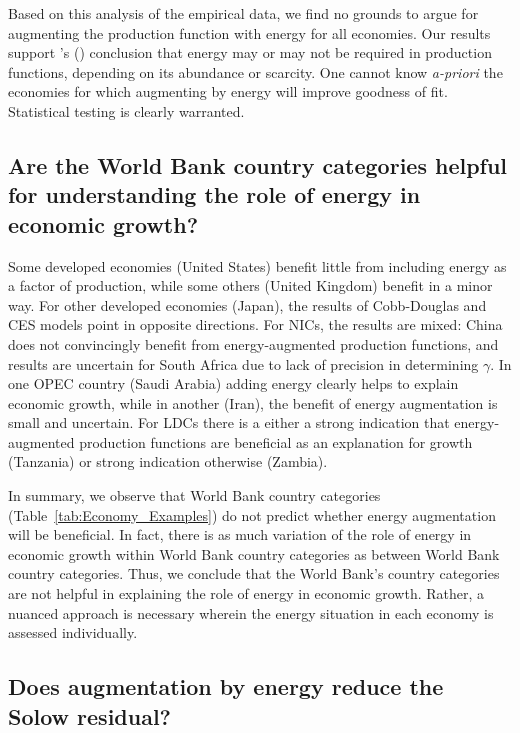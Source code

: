 \documentclass[preprint,authoryear,12pt]{elsarticle}\usepackage[]{graphicx}\usepackage[]{color}
\newcommand{\citeapos}[1]{\citeauthor{#1}'s (\citeyear{#1})} %
\begin{document}
Based on this analysis of the empirical data, 
we find no grounds to argue for augmenting the production function 
with energy for all economies. 
Our results support \citeapos{Stern:2011bq} conclusion that energy 
may or may not be required in production functions,
depending on its abundance or scarcity. 
One cannot know \emph{a-priori} the economies 
for which augmenting by energy will improve goodness of fit. 
Statistical testing is clearly warranted. 


\subsection{Are the World Bank country categories
helpful for understanding the role of energy in economic growth?} 
\label{sec:wb_categories_helpful}

Some developed economies (United States) benefit little from including energy as a factor of production, 
while some others (United Kingdom) benefit in a minor way. 
For other developed economies (Japan), 
the results of Cobb-Douglas and CES models point in opposite directions.  
For NICs, the results are mixed:
China does not convincingly benefit from energy-augmented production functions, 
and results are uncertain for South Africa due to lack of precision in determining $\gamma$.  
In one OPEC country (Saudi Arabia) adding energy clearly helps to explain economic growth, 
while in another (Iran), the benefit of energy augmentation is small and uncertain. 
For LDCs there is a either a strong indication that energy-augmented production functions 
are beneficial as an explanation for growth (Tanzania) or strong indication otherwise (Zambia).  

In summary, we observe that World Bank country categories (Table~\ref{tab:Economy_Examples}) 
do not predict whether energy augmentation will be beneficial. 
In fact, 
there is as much variation of the role of energy in economic growth 
within World Bank country categories
as between World Bank country categories. 
Thus, we conclude that the World Bank’s country categories are not helpful 
in explaining the role of energy in economic growth. 
Rather, a nuanced approach is necessary wherein the energy situation 
in each economy is assessed individually.


\subsection{Does augmentation by energy reduce the Solow residual?} 
\label{sec:energy_reduce_solow}
\end{document}
